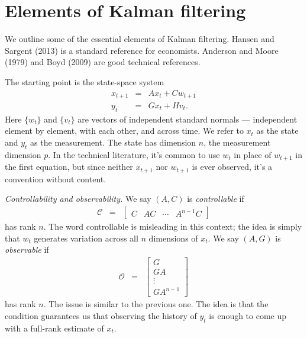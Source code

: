 \documentclass[12pt]{article}
\begin{document}
{\section{Elements of Kalman filtering}
\label{app:kalman}

We outline some of the essential elements of Kalman filtering.
Hansen and Sargent (2013) is a standard reference for economists.
Anderson and Moore (1979) and Boyd (2009) are good technical references.

The starting point is the state-space system
\begin{eqnarray*}
    x_{t+1} &=& A x_t + C w_{t+1} \\
    y_t  &=&  G x_t + H v_t .
\end{eqnarray*}
Here $ \{w_t \}$ and $\{ v_t \}$ are vectors of independent standard normals ---
independent element by element, with each other, and across time.
We refer to $x_t$ as the state and $y_t$ as the measurement.
The state has dimension $n$, the measurement dimension $p$.
In the technical literature,
it's common to use $w_t$ in place of $w_{t+1}$ in the first equation,
but since neither $x_{t+1}$ nor $w_{t+1}$ is ever observed,
it's a convention without content.


{\it Controllability and observability.\/}
We say $(A,C)$ is {\it controllable\/} if
\begin{eqnarray*}
    \mathcal{C} &=&
    \left[
    \begin{array}{cccc}
        C  & A C & \cdots & A^{n-1} C
    \end{array}
    \right]
\end{eqnarray*}
has rank $n$.
The word controllable is misleading in this context;
the idea is simply that $w_t$ generates variation across
all $n$ dimensions of $x_t$.
We say $(A,G)$ is {\it observable\/} if
\begin{eqnarray*}
    \mathcal{O} &=&
    \left[
    \begin{array}{c}
        G \\ G  A  \\ \vdots \\ G  A ^{n-1}
    \end{array}
    \right]
\end{eqnarray*}
has rank $n$.
The issue is similar to the previous one.
The idea is that the condition guarantees us that observing the history of $y_t$
is enough to come up with a full-rank estimate of $x_t$.


}
\end{document}
